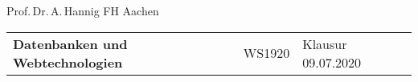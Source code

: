 \documentclass[DIV=16,parskip]{scrartcl} %
\begin{document}

\begin{flushleft}
{\footnotesize{Prof.\,Dr.\,A.\,Hannig \textbar{ }FH Aachen}} \\

\vspace{24pt}
\parindent=-0.5pt
\begin{tabu} {@{}X[l]X[c]X[r]@{}}
{\LARGE{\textbf{Datenbanken und Webtechnologien}}} & {\Large{WS1920}} & {\textnormal{Klausur 09.07.2020}} \\
\end{tabu}
\end{flushleft}

\vspace{24pt}

\newcommand{\udensdash}[1]{%
    \tikz[baseline=(todotted.base)]{
        \node[inner sep=1pt,outer sep=0pt] (todotted) {#1};
        \draw[densely dashed] (todotted.south west) -- (todotted.south east);
    }%
}%








\end{document}
